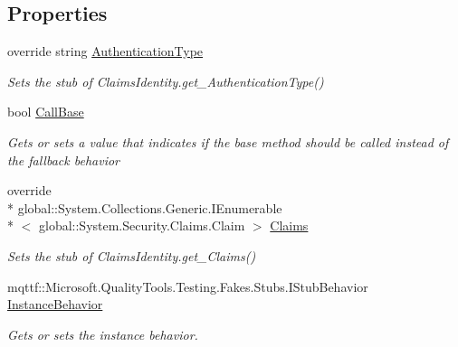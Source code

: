 \subsection*{Properties}
\begin{DoxyCompactItemize}
\item 
override string \hyperlink{class_system_1_1_security_1_1_claims_1_1_fakes_1_1_stub_claims_identity_ad81bf1aada585267ef9aa8f902284540}{Authentication\-Type}
\begin{DoxyCompactList}\small\item\em Sets the stub of Claims\-Identity.\-get\-\_\-\-Authentication\-Type()\end{DoxyCompactList}\item 
bool \hyperlink{class_system_1_1_security_1_1_claims_1_1_fakes_1_1_stub_claims_identity_ab5ae4c26358e777ac3bc8dca5e78637e}{Call\-Base}
\begin{DoxyCompactList}\small\item\em Gets or sets a value that indicates if the base method should be called instead of the fallback behavior\end{DoxyCompactList}\item 
override \\*
global\-::\-System.\-Collections.\-Generic.\-I\-Enumerable\\*
$<$ global\-::\-System.\-Security.\-Claims.\-Claim $>$ \hyperlink{class_system_1_1_security_1_1_claims_1_1_fakes_1_1_stub_claims_identity_a5a5f6db27ba5f507a6b0a6346126c738}{Claims}
\begin{DoxyCompactList}\small\item\em Sets the stub of Claims\-Identity.\-get\-\_\-\-Claims()\end{DoxyCompactList}\item 
mqttf\-::\-Microsoft.\-Quality\-Tools.\-Testing.\-Fakes.\-Stubs.\-I\-Stub\-Behavior \hyperlink{class_system_1_1_security_1_1_claims_1_1_fakes_1_1_stub_claims_identity_a7253db985c96680067d4c16cefacbac6}{Instance\-Behavior}
\begin{DoxyCompactList}\small\item\em Gets or sets the instance behavior.\end{DoxyCompactList}\item 

\end{DoxyCompactItemize}
